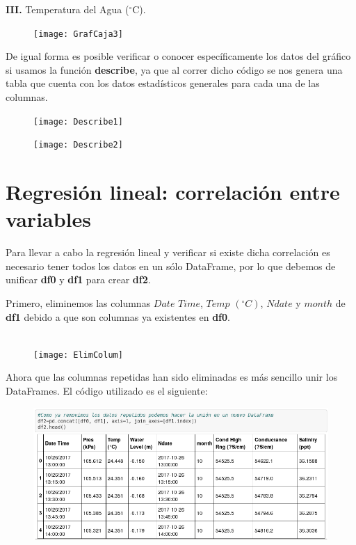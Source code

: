 \textbf{ III.} Temperatura del Agua ($^{\circ}$C).
\begin{figure}[h]
\centering
\texttt{[image: GrafCaja3]}
\end{figure}

De igual forma es posible verificar o conocer específicamente los datos del gráfico si usamos la función \textbf{describe}, ya que al correr dicho código se nos genera una tabla que cuenta con los datos estadísticos generales para cada una de las columnas.

\begin{figure}[h]
\centering
\texttt{[image: Describe1]}
\end{figure}

\begin{figure}[h]
\centering
\texttt{[image: Describe2]}
\end{figure}


\section{Regresión lineal: correlación entre variables}
Para llevar a cabo la regresión lineal y verificar si existe dicha correlación
es necesario tener todos los datos en un sólo DataFrame, por lo que debemos de unificar \textbf{df0} y \textbf{df1} para crear \textbf{df2}.

Primero, eliminemos las columnas $Date$ $Time$, $Temp$ $(^{\circ}C)$, $Ndate$ y $month$ de \textbf{df1} debido a que son columnas ya existentes en \textbf{df0}. \\ \\

\vfill

\begin{figure}[h]
\centering
\texttt{[image: ElimColum]}
\end{figure}

Ahora que las columnas repetidas han sido eliminadas es más sencillo unir los DataFrames. El código utilizado es el siguiente:
\\

\begin{figure}
\centering
\includegraphics[width=15cm]{Unir}
\end{figure} 

